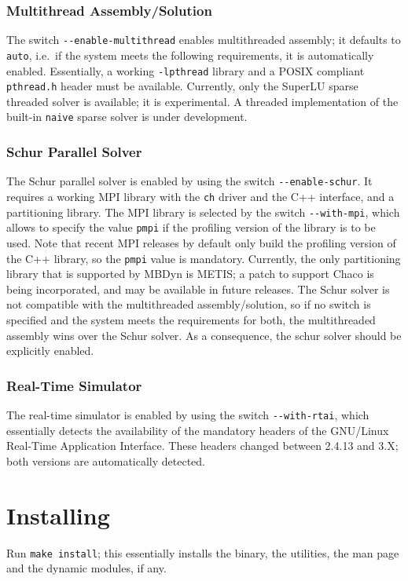 \documentclass[10pt,dvips]{report}
\newcommand{\kw}[1]{\texttt{#1}}
\begin{document}
\subsection{Multithread Assembly/Solution}
The switch \kw{-{}-enable-multithread} enables multithreaded assembly;
it defaults to \kw{auto}, i.e.\ if the system meets the following
requirements, it is automatically enabled.
Essentially, a working \kw{-lpthread} library and a POSIX compliant
\kw{pthread.h} header must be available.
Currently, only the SuperLU sparse threaded solver is available;
it is experimental.
A threaded implementation of the built-in \kw{naive} sparse solver 
is under development.

\subsection{Schur Parallel Solver}
The Schur parallel solver is enabled by using the switch
\kw{-{}-enable-schur}.
It requires a working MPI library with the \kw{ch} driver 
and the C++ interface, and a partitioning library.
The MPI library is selected by the switch \kw{-{}-with-mpi},
which allows to specify the value \kw{pmpi} if the profiling
version of the library is to be used.
Note that recent MPI releases by default only build the profiling
version of the C++ library, so the \kw{pmpi} value is mandatory.
Currently, the only partitioning library that is supported by MBDyn
is METIS; a patch to support Chaco is being incorporated,
and may be available in future releases.
The Schur solver is not compatible with the multithreaded
assembly/solution, so if no switch is specified and the system
meets the requirements for both, the multithreaded assembly wins
over the Schur solver.
As a consequence, the schur solver should be explicitly enabled.

\subsection{Real-Time Simulator}
The real-time simulator is enabled by using the switch
\kw{-{}-with-rtai}, which essentially detects the availability
of the mandatory headers of the GNU/Linux Real-Time Application
Interface.
These headers changed between 2.4.13 and 3.X; both versions 
are automatically detected.

\chapter{Installing}
Run \kw{make install}; this essentially installs the binary,
the utilities, the man page and the dynamic modules, if any.
\end{document}
